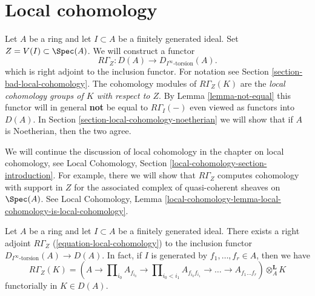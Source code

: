 \section{Local cohomology}
\label{section-local-cohomology}

\noindent
Let $A$ be a ring and let $I \subset A$ be a finitely generated ideal.
Set $Z = V(I) \subset \Spec(A)$. We will construct a functor
\begin{equation}
\label{equation-local-cohomology}
R\Gamma_Z : D(A) \longrightarrow D_{I^\infty\text{-torsion}}(A).
\end{equation}
which is right adjoint to the inclusion functor. For notation
see Section \ref{section-bad-local-cohomology}. The cohomology
modules of $R\Gamma_Z(K)$ are the {\it local cohomology groups
of $K$ with respect to $Z$}.
By Lemma \ref{lemma-not-equal} this functor will in general {\bf not} be
equal to $R\Gamma_I( - )$ even viewed as functors into $D(A)$.
In Section \ref{section-local-cohomology-noetherian}
we will show that if $A$ is Noetherian, then the two agree.

\medskip\noindent
We will continue the discussion of local cohomology in
the chapter on local cohomology, see
Local Cohomology, Section \ref{local-cohomology-section-introduction}.
For example, there we will show that $R\Gamma_Z$ computes cohomology
with support in $Z$ for the associated complex of quasi-coherent sheaves
on $\Spec(A)$. See Local Cohomology, Lemma
\ref{local-cohomology-lemma-local-cohomology-is-local-cohomology}.


\begin{lemma}
\label{lemma-local-cohomology-adjoint}
Let $A$ be a ring and let $I \subset A$ be a finitely generated ideal.
There exists a right adjoint $R\Gamma_Z$ (\ref{equation-local-cohomology})
to the inclusion functor $D_{I^\infty\text{-torsion}}(A) \to D(A)$.
In fact, if $I$ is generated by $f_1, \ldots, f_r \in A$, then we have
$$
R\Gamma_Z(K) =
(A \to \prod\nolimits_{i_0} A_{f_{i_0}} \to
\prod\nolimits_{i_0 < i_1} A_{f_{i_0}f_{i_1}}
\to \ldots \to A_{f_1\ldots f_r}) \otimes_A^\mathbf{L} K
$$
functorially in $K \in D(A)$.
\end{lemma}

